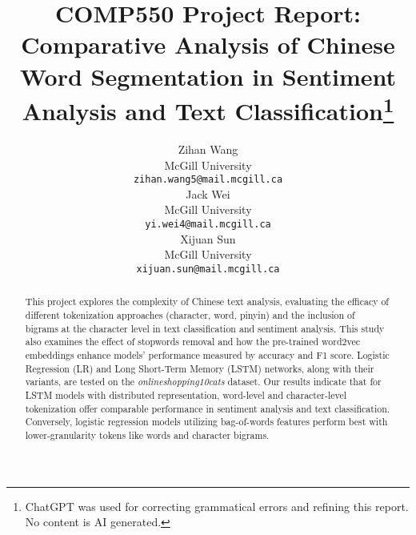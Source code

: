 \documentclass[11pt]{article}
\begin{document}
\title{COMP550 Project Report: Comparative Analysis of Chinese Word Segmentation in Sentiment Analysis and Text Classification\thanks{ChatGPT was used for correcting grammatical errors and refining this report. No content is AI generated.}}
\author{Zihan Wang \\
  McGill University\\
  \texttt{zihan.wang5@mail.mcgill.ca} \\
  \And
  Jack Wei \\
  McGill University\\
  \texttt{yi.wei4@mail.mcgill.ca} \\
  \And
  Xijuan Sun \\
  McGill University\\
  \texttt{xijuan.sun@mail.mcgill.ca} \\
  }

\maketitle

\begin{abstract}
This project explores the complexity of Chinese text analysis, evaluating the efficacy of different tokenization approaches (character, word, pinyin) and the inclusion of bigrams at the character level in text classification and sentiment analysis. This study also examines the effect of stopwords removal and how the pre-trained word2vec embeddings enhance models' performance measured by accuracy and F1 score. Logistic Regression (LR) and Long Short-Term Memory (LSTM) networks, along with their variants, are tested on the \textit{onlineshopping10cats} dataset. Our results indicate that for LSTM models with distributed representation, word-level and character-level tokenization offer comparable performance in sentiment analysis and text classification. Conversely, logistic regression models utilizing bag-of-words features perform best with lower-granularity tokens like words and character bigrams.
\end{abstract}



















\end{document}
